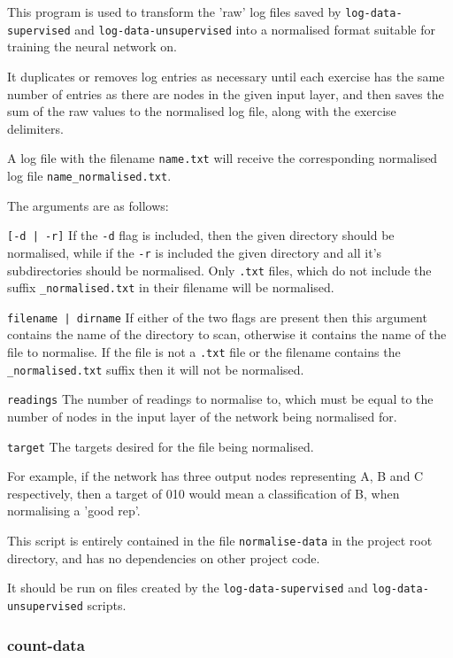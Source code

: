 \documentclass[a4paper]{article}
\begin{document}
This program is used to transform the 'raw' log files saved by \lstinline{log-data-supervised} and \lstinline{log-data-unsupervised} into a normalised format suitable for training the neural network on. 

It duplicates or removes log entries as necessary until each exercise has the same number of entries as there are nodes in the given input layer, and then saves the sum of the raw values to the normalised log file, along with the exercise delimiters.

A log file with the filename \lstinline{name.txt} will receive the corresponding normalised log file \lstinline{name_normalised.txt}.

The arguments are as follows:

\lstinline{[-d | -r]} If the \lstinline{-d} flag is included, then the given directory should be normalised, while if the \lstinline{-r} is included the given directory and all it's subdirectories should be normalised. Only \lstinline{.txt} files, which do not include the suffix \lstinline{_normalised.txt} in their filename will be normalised.

\lstinline{filename | dirname} If either of the two flags are present then this argument contains the name of the directory to scan, otherwise it contains the name of the file to normalise. If the file is not a \lstinline{.txt} file or the filename contains the \lstinline{_normalised.txt} suffix then it will not be normalised.

\lstinline{readings} The number of readings to normalise to, which must be equal to the number of nodes in the input layer of the network being normalised for.

\lstinline{target} The targets desired for the file being normalised.

For example, if the network has three output nodes representing A, B and C respectively, then a target of 010 would mean a classification of B, when normalising a 'good rep'.

This script is entirely contained in the file \lstinline{normalise-data} in the project root directory, and has no dependencies on other project code.

It should be run on files created by the \lstinline{log-data-supervised} and \lstinline{log-data-unsupervised} scripts.

\newpage
\subsubsection{count-data}
\label{subsubsec:dc_csa_countdata}
\end{document}
